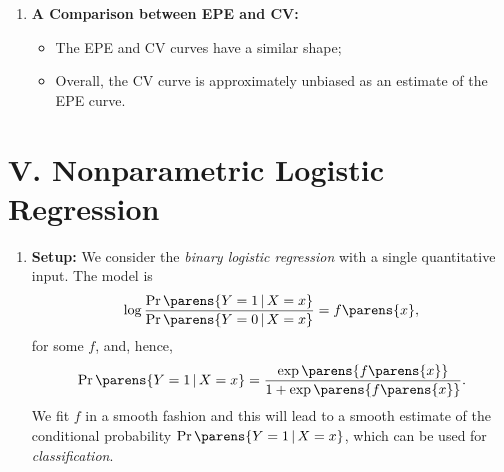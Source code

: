 \documentclass[12pt]{article}
\begin{document}
\begin{enumerate}[label=\textbf{\arabic*.}]
	\item \textbf{A Comparison between EPE and CV:} 
	\begin{itemize}
		\item The EPE and CV curves have a similar shape; 
		\item Overall, the CV curve is approximately unbiased as an estimate of the EPE curve. 
	\end{itemize}
	
\end{enumerate}

\section*{V. Nonparametric Logistic Regression}

\begin{enumerate}[label=\textbf{\arabic*.}]
	
	\item \textbf{Setup:} We consider the \textit{binary logistic regression} with a single quantitative input. The model is 
	\begin{align*}
		\log \frac{\Pr \parens{Y = 1 \,\vert\, X = x}}{\Pr \parens{Y = 0 \,\vert\, X = x}} = f \parens{x}, 
	\end{align*}
	for some $f$, and, hence, 
	\begin{align*}
		\Pr \parens{Y = 1 \,\vert\, X = x} = \frac{\exp \parens{f \parens{x} }}{1 + \exp \parens{f \parens{x}} }. 
	\end{align*}
	We fit $f$ in a smooth fashion and this will lead to a smooth estimate of the conditional probability $ \Pr \parens{Y = 1 \,\vert\, X = x}$, which can be used for \textit{classification}. 
	

\end{enumerate}
\end{document}
